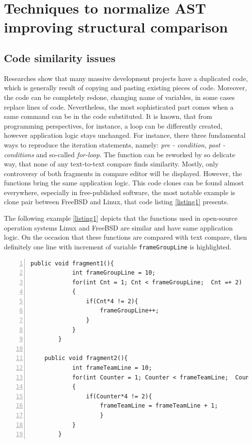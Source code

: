 \documentclass{report}
\begin{document}


%

\chapter{Techniques to normalize AST improving structural comparison}
\label{cha:ast_normal}
\section{Code similarity issues}
Researches show that many massive development projects have a duplicated code, which is generally result of copying and pasting existing pieces of code. Moreover, the code can be completely redone, changing name of variables, in some cases replace lines of code. Nevertheless, the most sophisticated part comes when a same command can be in the code substituted. It is known, that from programming perspectives, for instance, a loop can be differently created, however application logic stays unchanged. For instance, there three fundamental ways to reproduce the iteration statements, namely: \emph{pre - condition}, \emph{post - conditions} and so-called \emph{for-loop}. The function can be reworked by so delicate way, that none of any text-to-text compare finds similarity. Mostly, only controversy of both fragments in compare editor will be displayed.
However, the functions bring the same application logic. This code clones can be found almost everywhere, especially in free-published software, the most notable example is clone pair between FreeBSD and Linux, that code listing \ref{listing1} presents. 

The following example \ref{listing1} depicts that the functions used in open-source operation systems Linux and FreeBSD are similar and have same application logic. On the occasion that these functions are compared with text compare, then definitely one line with increment of variable \texttt{frameGroupLine} is highlighted. 
\newpage
\begin{lstlisting}[caption={Clone pair between FreeBSD and Linux}, label = listing1, numbers=left, numbersep=-5pt]
	public void fragment1(){
			int frameGroupLine = 10;
			for(int Cnt = 1; Cnt < frameGroupLine;  Cnt =+ 2)
			{
				if(Cnt*4 != 2){
					frameGroupLine++;
				}
			}
		}
			
	public void fragment2(){
			int frameTeamLine = 10;
			for(int Counter = 1; Counter < frameTeamLine;  Counter =+ 2)
			{
				if(Counter*4 != 2){ 
					frameTeamLine = frameTeamLine + 1;
					}
			}
		}	
\end{lstlisting}
\end{document}
